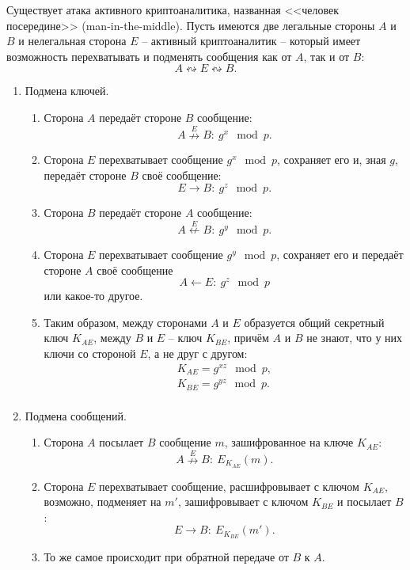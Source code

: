 Существует атака активного криптоаналитика, названная <<человек посередине>> (man-in-the-middle). Пусть имеются две легальные стороны $A$ и $B$ и нелегальная сторона $E$ -- активный криптоаналитик -- который имеет возможность перехватывать и подменять сообщения как от $A$, так и от $B$:
    \[ A \leftrightsquigarrow E \leftrightsquigarrow B. \]

\begin{enumerate}
    \item Подмена ключей.
        \begin{enumerate}
            \item Сторона $A$ передаёт стороне $B$ сообщение:
                \[ A \overset{E}{\nrightarrow} B: ~ g^x \mod p. \]
            \item Сторона $E$ перехватывает сообщение $g^x \mod p$, сохраняет его и, зная $g$, передаёт стороне $B$ своё сообщение:
                \[ E \rightarrow B: ~ g^z \mod p. \]
            \item Сторона $B$ передаёт стороне $A$ сообщение:
                \[ A \overset{E}{\nleftarrow} B: ~ g^y \mod p. \]
            \item Сторона $E$ перехватывает сообщение $g^y \mod p$, сохраняет его и передаёт стороне $A$ своё сообщение
                \[ A \leftarrow E: ~ g^z \mod p \]
                или какое-то другое.
            \item Таким образом, между сторонами $A$ и $E$ образуется общий секретный ключ $K_{AE}$, между $B$ и $E$ -- ключ $K_{BE}$, причём $A$ и $B$ не знают, что у них ключи со стороной $E$, а не друг с другом:
                \[ \begin{array} {l}
                    K_{AE} = g^{xz} \mod p, \\
                    K_{BE} = g^{yz} \mod p. \\
                \end{array} \]

        \end{enumerate}
    \item Подмена сообщений.
        \begin{enumerate}
            \item Сторона $A$ посылает $B$ сообщение $m$, зашифрованное на ключе $K_{AE}$:
                \[ A \overset{E}{\nrightarrow} B: ~ E_{K_{AE}}(m). \]
            \item Сторона $E$ перехватывает сообщение, расшифровывает с ключом $K_{AE}$, возможно, подменяет на $m'$, зашифровывает с ключом $K_{BE}$ и посылает $B$:
                \[ E \rightarrow B: ~ E_{K_{BE}}(m'). \]
            \item То же самое происходит при обратной передаче от $B$ к $A$.
        \end{enumerate}
\end{enumerate}


